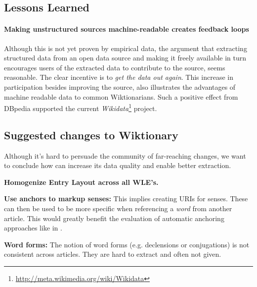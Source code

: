 \subsection{Lessons Learned}
\paragraph{Making unstructured sources machine-readable creates feedback loops}

Although this is not yet proven by empirical data, the argument that extracting structured data from an open data source and making it freely available in turn encourages users of the extracted data to contribute to the source, seems reasonable.
The clear incentive is to \textit{get the data out again}.
This increase in participation besides improving the source, also illustrates the advantages of machine readable data to common Wiktionarians.
Such a positive effect from DBpedia supported the current \textit{Wikidata}\footnote{\url{http://meta.wikimedia.org/wiki/Wikidata}} project.

\subsection{Suggested changes to Wiktionary}
Although it's hard to persuade the community of far-reaching changes, we want to conclude how \wik can increase its data quality and enable better extraction.
\begin{compactitem}
	\item \textbf{Homogenize Entry Layout across all WLE's.}
	\item \textbf{Use anchors to markup senses:}
		This implies creating URIs for senses.
		These can then be used to be more specific when referencing a \textit{word} from another article. 
		This would greatly benefit the evaluation of automatic anchoring approaches like in \cite{meyer_2011b}.
	\item \textbf{Word forms:}
		The notion of word forms (e.g. declensions or conjugations) is not consistent across articles.
		They are hard to extract and often not given.
\end{compactitem}


\newpage

